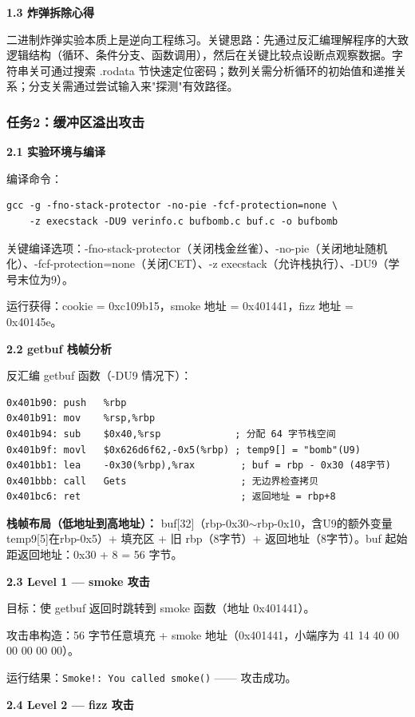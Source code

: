 \documentclass[12pt,a4paper]{ctexart}
\begin{document}
\textbf{1.3 炸弹拆除心得}

二进制炸弹实验本质上是逆向工程练习。关键思路：先通过反汇编理解程序的大致逻辑结构（循环、条件分支、函数调用），然后在关键比较点设断点观察数据。字符串关可通过搜索 .rodata 节快速定位密码；数列关需分析循环的初始值和递推关系；分支关需通过尝试输入来"探测"有效路径。

\subsubsection*{任务2：缓冲区溢出攻击}

\textbf{2.1 实验环境与编译}

编译命令：
\begin{lstlisting}
gcc -g -fno-stack-protector -no-pie -fcf-protection=none \
    -z execstack -DU9 verinfo.c bufbomb.c buf.c -o bufbomb
\end{lstlisting}

关键编译选项：-fno-stack-protector（关闭栈金丝雀）、-no-pie（关闭地址随机化）、-fcf-protection=none（关闭CET）、-z execstack（允许栈执行）、-DU9（学号末位为9）。

运行获得：cookie = 0xc109b15，smoke 地址 = 0x401441，fizz 地址 = 0x40145e。

\textbf{2.2 getbuf 栈帧分析}

反汇编 getbuf 函数（-DU9 情况下）：

\begin{lstlisting}
0x401b90: push   %rbp
0x401b91: mov    %rsp,%rbp
0x401b94: sub    $0x40,%rsp             ; 分配 64 字节栈空间
0x401b9f: movl   $0x626d6f62,-0x5(%rbp) ; temp9[] = "bomb"(U9)
0x401bb1: lea    -0x30(%rbp),%rax        ; buf = rbp - 0x30 (48字节)
0x401bbb: call   Gets                    ; 无边界检查拷贝
0x401bc6: ret                            ; 返回地址 = rbp+8
\end{lstlisting}

\textbf{栈帧布局（低地址到高地址）：}
buf[32]（rbp-0x30$\sim$rbp-0x10，含U9的额外变量temp9[5]在rbp-0x5）+ 填充区 + 旧 rbp（8字节）+ 返回地址（8字节）。buf 起始距返回地址：0x30 + 8 = 56 字节。

\textbf{2.3 Level 1 — smoke 攻击}

目标：使 getbuf 返回时跳转到 smoke 函数（地址 0x401441）。

攻击串构造：56 字节任意填充 + smoke 地址（0x401441，小端序为 41 14 40 00 00 00 00 00）。

运行结果：\texttt{Smoke!: You called smoke()} —— 攻击成功。

\textbf{2.4 Level 2 — fizz 攻击}
\end{document}
